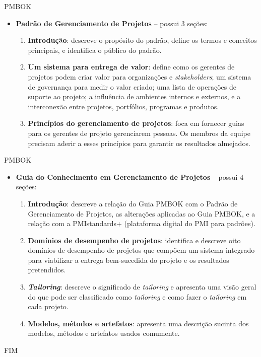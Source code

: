\documentclass{beamer}
\begin{document}
\begin{frame}{PMBOK}
	\begin{itemize}
		\justifying
		\item \textbf{Padrão de Gerenciamento de Projetos} -- possui 3 seções:
		\begin{enumerate}
			\justifying
			\item<1> \textbf{Introdução}: descreve o propósito do padrão, define os termos e conceitos principais, e identifica o público do padrão.
			\item<2> \textbf{Um sistema para entrega de valor}: define como os gerentes de projetos podem criar valor para organizações e \textit{stakeholders}; um sistema de governança para medir o valor criado; uma lista de operações de suporte ao projeto; a influência de ambientes internos e externos, e a interconexão entre projetos, portfólios, programas e produtos.
			\item<3> \textbf{Princípios do gerenciamento de projetos}: foca em fornecer guias para os gerentes de projeto gerenciarem pessoas. Os membros da equipe precisam aderir a esses princípios para garantir os resultados almejados.
		\end{enumerate}
	\end{itemize}
\end{frame}

\begin{frame}{PMBOK}
	\begin{itemize}
		\justifying
		\item \textbf{Guia do Conhecimento em Gerenciamento de Projetos} -- possui 4 seções:
		\begin{enumerate}
			\justifying
			\item<1> \textbf{Introdução}: descreve a relação do Guia PMBOK com o Padrão de Gerenciamento de Projetos, as alterações aplicadas ao Guia PMBOK, e a relação com a PMIstandards+ (plataforma digital do PMI para padrões).
			\item<2> \textbf{Domínios de desempenho de projetos}: identifica e descreve oito domínios de desempenho de projetos que compõem um sistema integrado para viabilizar a entrega bem-sucedida do projeto e os resultados pretendidos.
			\item<3> \textbf{\textit{Tailoring}}: descreve o significado de \textit{tailoring} e apresenta uma visão geral do que pode ser classificado como \textit{tailoring} e como fazer o \textit{tailoring} em cada projeto.
			\item<4> \textbf{Modelos, métodos e artefatos}: apresenta uma descrição sucinta dos modelos, métodos e artefatos usados comumente.
		\end{enumerate}
	\end{itemize}
\end{frame}


\begin{frame}
    \centering
    \Large
    FIM
\end{frame}
    
\end{document}
